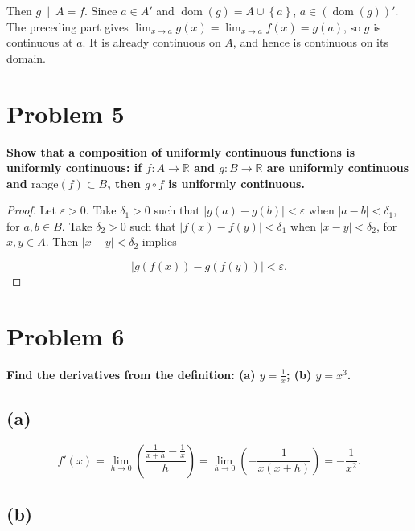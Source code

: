 Then \(\left. g\  \middle| \ A = f \right.\). Since \(a \in A'\) and \(\operatorname{dom}(g) = A \cup \left\{ a \right\}\), \(a \in \left( {\operatorname{dom}(g)} \right)'\). The preceding part gives \(\lim_{x\rightarrow a}g(x) = \lim_{x\rightarrow a}f(x) = g(a)\), so \(g\) is continuous at \(a\). It is already continuous on \(A\), and hence is continuous on its domain.

\section{Problem 5}

\textbf{Show that a composition of uniformly continuous functions is uniformly continuous: if \(f:A\rightarrow\mathbb{R}\) and \(g:B\rightarrow\mathbb{R}\) are uniformly continuous and \(\text{range}(f) \subset B\), then \(g \circ f\) is uniformly continuous.}

\begin{proof}

Let \(\varepsilon > 0\). Take \(\delta_{1} > 0\) such that \(\left| {g(a) - g(b)} \right| < \varepsilon\) when \(\left| {a - b} \right| < \delta_{1}\), for \(a,b \in B\). Take \(\delta_{2} > 0\) such that \(\left| {f(x) - f(y)} \right| < \delta_{1}\) when \(\left| {x - y} \right| < \delta_{2}\), for \(x,y \in A\). Then \(\left| {x - y} \right| < \delta_{2}\) implies

\[\left| {g\left( {f(x)} \right) - g\left( {f(y)} \right)} \right| < \varepsilon.\]

\end{proof}

\section{Problem 6}

\textbf{Find the derivatives from the definition: (a) \(y = \frac{1}{x}\); (b) \(y = x^{3}\).}

\subsection{(a)}

\[f'(x) = \lim\limits_{h\rightarrow 0}\left( \frac{\frac{1}{x + h} - \frac{1}{x}}{h} \right) = \lim\limits_{h\rightarrow 0}\left( {- \frac{1}{x\left( {x + h} \right)}} \right) = - \frac{1}{x^{2}}.\]

\subsection{(b)}

